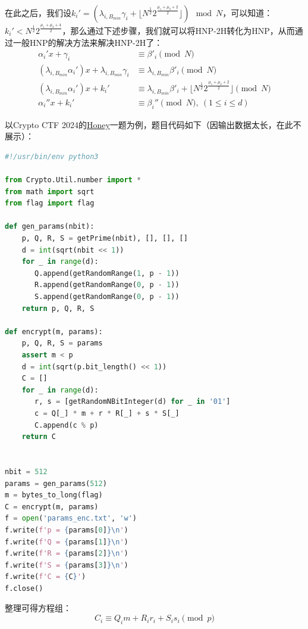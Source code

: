 \documentclass{book}
\numberwithin{equation}{subsubsection}
\begin{document}
在此之后，我们设$k_i'=\left(\lambda_{i,B_{min}}\gamma_i+\lfloor N^{\frac{1}{2}}2^{\frac{\mu_1+\mu_2+2}{2}}\rfloor\right)\mod{N}$，可以知道：$k_i'<N^{\frac{1}{2}}2^{\frac{\mu_1+\mu_2+4}{2}}$，那么通过下述步骤，我们就可以将HNP-2H转化为HNP，从而通过一般HNP的解决方法来解决HNP-2H了：
\begin{equation}
    \begin{aligned}
        \alpha_i'x+\gamma_i&\equiv\beta'_i\pmod{N}\\
        (\lambda_{i,B_{min}}\alpha_i')x+\lambda_{i,B_{min}}\gamma_i&\equiv\lambda_{i,B_{min}}\beta'_i\pmod{N}\\
        (\lambda_{i,B_{min}}\alpha_i')x+k_i'&\equiv\lambda_{i,B_{min}}\beta'_i+\lfloor N^{\frac{1}{2}}2^{\frac{\mu_1+\mu_2+2}{2}}\rfloor\pmod{N}\\
        \alpha_i''x+k_i'&\equiv\beta_i''\pmod{N},\ (1\le i\le d)
    \end{aligned}
    \nonumber
\end{equation}\par
以Crypto CTF 2024的\href{https://www.nssctf.cn/problem/5657}{Honey}一题为例，题目代码如下（因输出数据太长，在此不展示）：
\begin{lstlisting}[language=Python,basicstyle=\ttfamily,breaklines=true,keywordstyle=\bfseries\color{blue}]
#!/usr/bin/env python3  
  
from Crypto.Util.number import *  
from math import sqrt  
from flag import flag  
  
def gen_params(nbit):  
    p, Q, R, S = getPrime(nbit), [], [], []  
    d = int(sqrt(nbit << 1))  
    for _ in range(d):  
       Q.append(getRandomRange(1, p - 1))  
       R.append(getRandomRange(0, p - 1))  
       S.append(getRandomRange(0, p - 1))  
    return p, Q, R, S  
  
def encrypt(m, params):  
    p, Q, R, S = params  
    assert m < p  
    d = int(sqrt(p.bit_length() << 1))  
    C = []  
    for _ in range(d):  
       r, s = [getRandomNBitInteger(d) for _ in '01']  
       c = Q[_] * m + r * R[_] + s * S[_]  
       C.append(c % p)  
    return C  
  
  
nbit = 512  
params = gen_params(512)  
m = bytes_to_long(flag)  
C = encrypt(m, params)  
f = open('params_enc.txt', 'w')  
f.write(f'p = {params[0]}\n')  
f.write(f'Q = {params[1]}\n')  
f.write(f'R = {params[2]}\n')  
f.write(f'S = {params[3]}\n')  
f.write(f'C = {C}')  
f.close()
\end{lstlisting}
整理可得方程组：
\begin{equation}
    C_i\equiv Q_im+R_ir_i+S_is_i\pmod{p}
    \nonumber
\end{equation}
\end{document}
